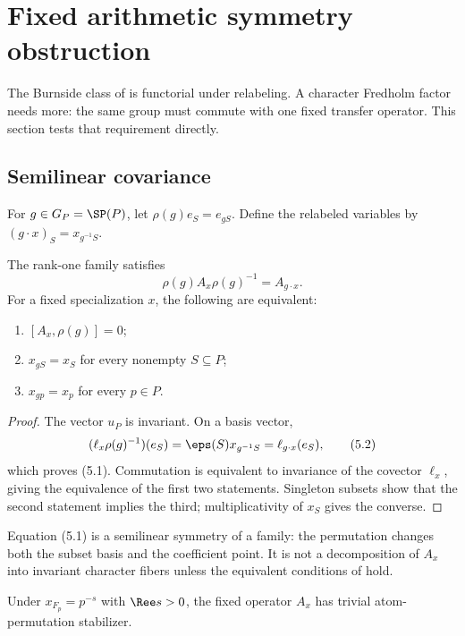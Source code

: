 \section{Fixed arithmetic symmetry obstruction}
\label{sec:symmetry}

The Burnside class of  is functorial under relabeling.  A
character Fredholm factor needs more: the same group must commute with one
fixed transfer operator.  This section tests that requirement directly.

\subsection{Semilinear covariance}

For $g\in G_P=\SP(P)$, let $\rho(g)e_S=e_{gS}$.  Define the relabeled
variables by $(g\cdot x)_S=x_{g^{-1}S}$.

\begin{theorem}
\label{thm:covariance}
The rank-one family satisfies
\[
  \rho(g)A_x\rho(g)^{-1}=A_{g\cdot x}.
  \tag{5.1}
\]
For a fixed specialization $x$, the following are equivalent:
\begin{enumerate}
\item $[A_x,\rho(g)]=0$;
\item $x_{gS}=x_S$ for every nonempty $S\subseteq P$;
\item $x_{gp}=x_p$ for every $p\in P$.
\end{enumerate}
\end{theorem}

\begin{proof}
The vector $u_P$ is invariant.  On a basis vector,
\[
 (\ell_x\rho(g)^{-1})(e_S)
 =\eps(S)x_{g^{-1}S}=\ell_{g\cdot x}(e_S),
 \tag{5.2}
\]
which proves (5.1).  Commutation is equivalent to invariance of the covector
$\ell_x$, giving the equivalence of the first two statements.  Singleton
subsets show that the second statement implies the third; multiplicativity
of $x_S$ gives the converse.
\end{proof}

Equation (5.1) is a semilinear symmetry of a family: the permutation changes
both the subset basis and the coefficient point.  It is not a decomposition
of $A_x$ into invariant character fibers unless the equivalent conditions of
 hold.

\begin{corollary}
\label{cor:arithmetic-stabilizer}
Under $x_{F_p}=p^{-s}$ with $\Ree s>0$, the fixed operator $A_x$ has trivial
atom-permutation stabilizer.
\end{corollary}

